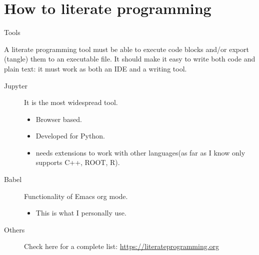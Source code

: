 \documentclass{Gesue_PresentationTemplate}
\begin{document}
\section{How to literate programming}
\begin{frame}{Tools}
  \begin{block}{}
    A literate programming tool must be able to
    execute code blocks and/or export (tangle)
    them to an executable file.
    It should make it easy to write both code
    and plain text: it must work as both
    an IDE and a writing tool.
  \end{block}
  \begin{description}
    \item[Jupyter \cite{jupyter}] It is the most
          widespread tool.
          \begin{itemize}
            \item Browser based.
            \item Developed for Python.
            \item needs extensions to work with
                  other languages(as far as I
                  know only supports C++, ROOT, R).
          \end{itemize}
    \item[Babel \cite{babel}] Functionality
          of Emacs\cite{emacs}
          org mode\cite{orgmode}.
          \begin{itemize}
            \item This is what I personally use.
          \end{itemize}
    \item[Others] Check here for a complete list:
          \url{https://literateprogramming.org}
  \end{description}
\end{frame}
\end{document}
